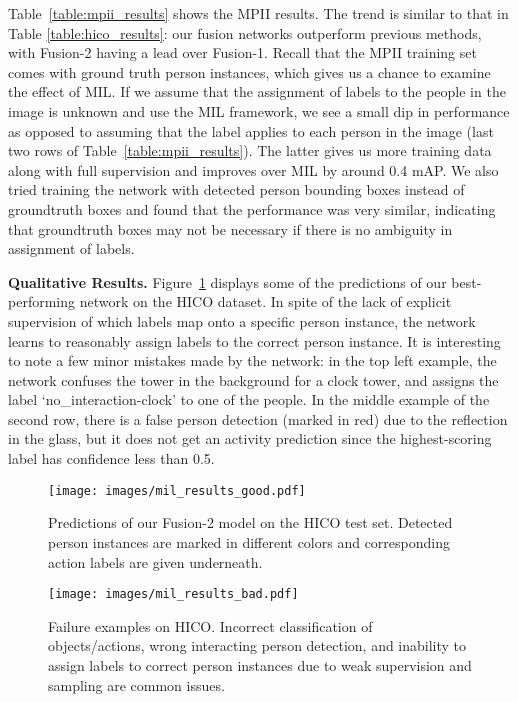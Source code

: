 \documentclass[runningheads]{llncs}
\begin{document}
Table~\ref{table:mpii_results} shows the MPII results. The trend is similar to that in Table \ref{table:hico_results}: our fusion networks outperform previous methods, with Fusion-2 having a lead over Fusion-1. Recall that the MPII training set comes with ground truth person instances, which gives us a chance to examine the effect of MIL. If we assume that the assignment of labels to the people in the image is unknown and use the MIL framework, we see a small dip in performance as opposed to assuming that the label applies to each person in the image (last two rows of Table~\ref{table:mpii_results}). The latter gives us more training data along with full supervision and improves over MIL by around 0.4 mAP. We also tried training the network with detected person bounding boxes instead of groundtruth boxes and found that the performance was very similar, indicating that groundtruth boxes may not be necessary if there is no ambiguity in assignment of labels.

{\bf Qualitative Results.}
Figure~\ref{fig:hico_mil_good} displays some of the predictions of our best-performing network on the HICO dataset. In spite of the lack of explicit supervision of which labels map onto a specific person instance, the network learns to reasonably assign labels to the correct person instance. It is interesting to note a few minor mistakes made by the network: in the top left example, the network confuses the tower in the background for a clock tower, and assigns the label `no\_interaction-clock' to one of the people. In the middle example of the second row, there is a false person detection (marked in red) due to the reflection in the glass, but it does not get an activity prediction since the highest-scoring label has confidence less than 0.5. 

\begin{figure}[t!]
    \centering
    \texttt{[image: images/mil\_results\_good.pdf]}
\caption{Predictions of our Fusion-2 model on the HICO test set. Detected person instances are marked in different colors and corresponding action labels are given underneath.}
    \label{fig:hico_mil_good}
\end{figure}
\begin{figure}[h!]
    \centering
    \texttt{[image: images/mil\_results\_bad.pdf]}
\caption{Failure examples on HICO. Incorrect classification of objects/actions, wrong interacting person detection, and inability to assign labels to correct person instances due to weak supervision and sampling are common issues.}
    \label{fig:hico_mil_bad}
\end{figure}
\end{document}
